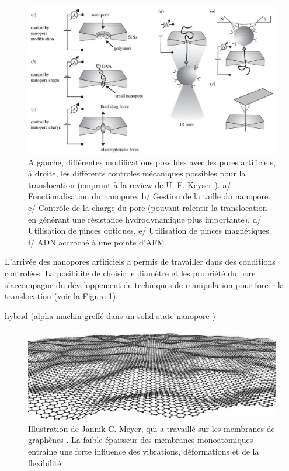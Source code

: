 \begin{figure}[h!]
\begin{center}
\includegraphics[width=1.0\textwidth]{solidstatenanopore.jpg}


\caption[Pores artificiels et manipulations]{A gauche, différentes modifications possibles avec les pores artificiels, à droite, les différents controles mécaniques possibles pour la translocation (emprunt à la review de U. F. Keyser \cite{keyser}). a/ Fonctionalisation du nanopore. b/ Gestion de la taille du nanopore. c/ Contrôle de la charge du pore (pouvant ralentir la translocation en générant une résistance hydrodynamique plus importante). d/ Utilisation de pinces optiques. e/ Utilisation de pinces magnétiques. f/ ADN accroché à une pointe d'AFM. }
\label{solidstateporepossib}
\end{center}
\end{figure}


L'arrivée des nanopores artificiels a permis de travailler dans des conditions controlées. La posibilité de choisir le diamètre et les propriété du pore s'accompagne du développement de techniques de manipulation pour forcer la translocation (voir la Figure \ref{solidstateporepossib}).




hybrid (alpha machin greffé dans un solid state nanopore \cite{Hall2010})


\begin{figure}[h!]
\begin{center}
\includegraphics[width=1.0\textwidth]{vib.jpg}


\caption[Vibration et déformation d'une mono-couche de graphène]{Illustration de Jannik C. Meyer, qui a travaillé sur les membranes de graphènes \cite{Meyer2007}. La faible épaisseur des membranes monoatomiques entraine une forte influence des vibrations, déformations et de la flexibilité.}
\label{membvib}
\end{center}
\end{figure}

